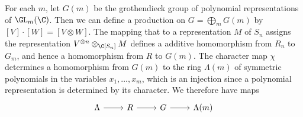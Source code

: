 For each $m$, let $G(m)$ be the grothendieck group of polynomial representations of $\GL_m(\C)$. Then we can define a production on $G=\bigoplus_mG(m)$ by $[V]\cdot[W]=[V\otimes W]$. The mapping that to a representation $M$ of $S_n$ assigns the representation $V^{\otimes n}\otimes_{\C[S_n]}M$ defines a additive homomorphism from $R_n$ to $G_m$, and hence a homomorphism from $R$ to $G(m)$. The character map $\chi$ determines a homomorphism from $G(m)$ to the ring $\Lambda(m)$ of symmetric polynomials in the variables $x_1,\dots,x_m$, which is an injection since a polynomial representation is determined by its character. We therefore have maps
\[\begin{tikzcd}
\Lambda\ar[r]&R\ar[r]&G\ar[r]&\Lambda(m)
\end{tikzcd}\]